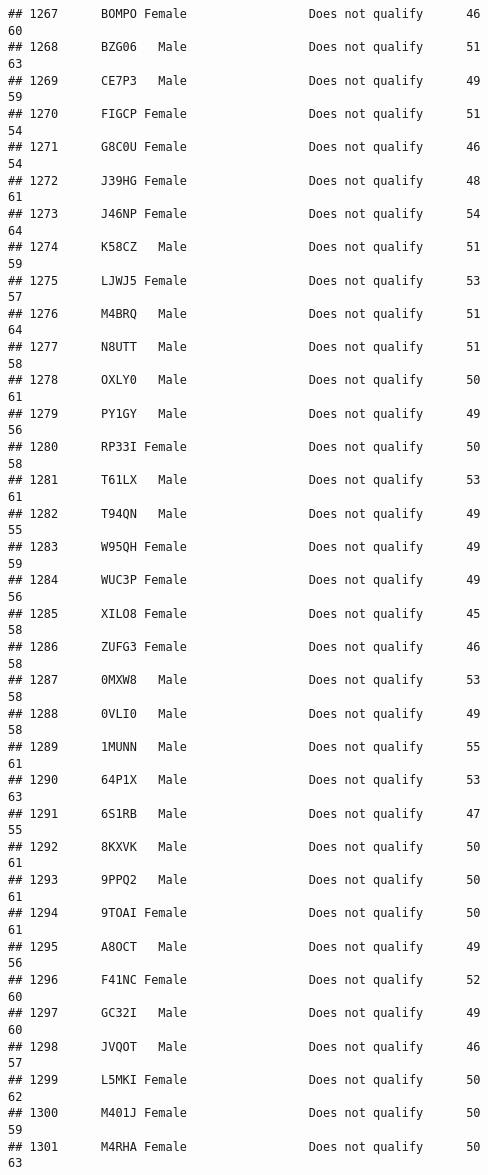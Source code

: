 \documentclass[
]{article}
\begin{document}
\begin{verbatim}
## 1267      BOMPO Female                 Does not qualify      46       60
## 1268      BZG06   Male                 Does not qualify      51       63
## 1269      CE7P3   Male                 Does not qualify      49       59
## 1270      FIGCP Female                 Does not qualify      51       54
## 1271      G8C0U Female                 Does not qualify      46       54
## 1272      J39HG Female                 Does not qualify      48       61
## 1273      J46NP Female                 Does not qualify      54       64
## 1274      K58CZ   Male                 Does not qualify      51       59
## 1275      LJWJ5 Female                 Does not qualify      53       57
## 1276      M4BRQ   Male                 Does not qualify      51       64
## 1277      N8UTT   Male                 Does not qualify      51       58
## 1278      OXLY0   Male                 Does not qualify      50       61
## 1279      PY1GY   Male                 Does not qualify      49       56
## 1280      RP33I Female                 Does not qualify      50       58
## 1281      T61LX   Male                 Does not qualify      53       61
## 1282      T94QN   Male                 Does not qualify      49       55
## 1283      W95QH Female                 Does not qualify      49       59
## 1284      WUC3P Female                 Does not qualify      49       56
## 1285      XILO8 Female                 Does not qualify      45       58
## 1286      ZUFG3 Female                 Does not qualify      46       58
## 1287      0MXW8   Male                 Does not qualify      53       58
## 1288      0VLI0   Male                 Does not qualify      49       58
## 1289      1MUNN   Male                 Does not qualify      55       61
## 1290      64P1X   Male                 Does not qualify      53       63
## 1291      6S1RB   Male                 Does not qualify      47       55
## 1292      8KXVK   Male                 Does not qualify      50       61
## 1293      9PPQ2   Male                 Does not qualify      50       61
## 1294      9TOAI Female                 Does not qualify      50       61
## 1295      A8OCT   Male                 Does not qualify      49       56
## 1296      F41NC Female                 Does not qualify      52       60
## 1297      GC32I   Male                 Does not qualify      49       60
## 1298      JVQOT   Male                 Does not qualify      46       57
## 1299      L5MKI Female                 Does not qualify      50       62
## 1300      M401J Female                 Does not qualify      50       59
## 1301      M4RHA Female                 Does not qualify      50       63

\end{verbatim}
\end{document}
